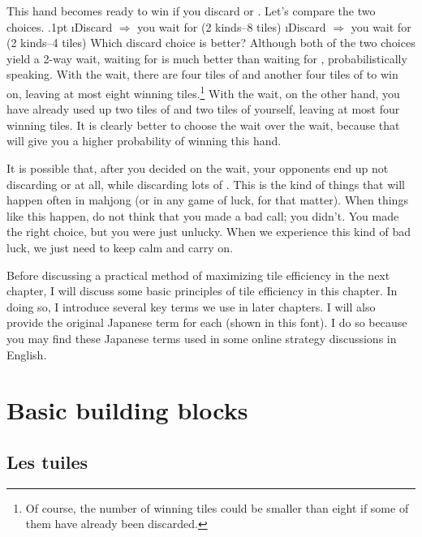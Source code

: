 \bigskip
\noindent
This hand becomes ready to win if you discard {\LARGE{}} or {\LARGE{}}. Let's compare the two choices.
\bi\itemsep.1pt
\i Discard {\LARGE{}} \hfill $\Rightarrow$ you wait for {\LARGE{} } (2 kinds--8 tiles)
\i Discard {\LARGE{}} \hfill $\Rightarrow$ you wait for {\LARGE{}} {\LARGE{}} (2 kinds--4 tiles)
\ei
Which discard choice is better? Although both of the two choices yield a 2-way wait, waiting for {\LARGE{} } is much better than waiting for {\LARGE{}} {\LARGE{}}, probabilistically speaking. With the {\LARGE{} } wait, there are four tiles of {\LARGE{}} and another four tiles of {\LARGE{}} to win on, leaving at most eight winning tiles.\footnote{Of course, the number of winning tiles could be smaller than eight if some of them have already been discarded.} 
With the {\LARGE{}} {\LARGE{}} wait, on the other hand, you have already used up two tiles of {\LARGE{}} and two tiles of {\LARGE{}} yourself, leaving at most four winning tiles. It is clearly better to choose the {\LARGE{} } wait over the {\LARGE{}} {\LARGE{}} wait, because that will give you a higher probability of winning this hand. 

\bigskip
It is possible that, after you decided on the {\LARGE{} } wait, your opponents end up not discarding {\LARGE{}} or {\LARGE{}} at all, while discarding lots of {\LARGE{} }. This is the kind of things that will happen often in mahjong (or in any game of luck, for that matter). When things like this happen, do not think that you made a bad call; you didn't. You made the right choice, but you were just unlucky. When we experience this kind of bad luck, we just need to keep calm and carry on. 

\bigskip
Before discussing a practical method of maximizing tile efficiency in the next chapter, I will discuss some basic principles of tile efficiency in this chapter. In doing so, I introduce several key terms we use in later chapters. I will also provide the original Japanese term for each (shown in {\jap this font}). I do so because you may find these Japanese terms used in some online strategy discussions in English.

\section{Basic building blocks}

\subsection{Les tuiles}

